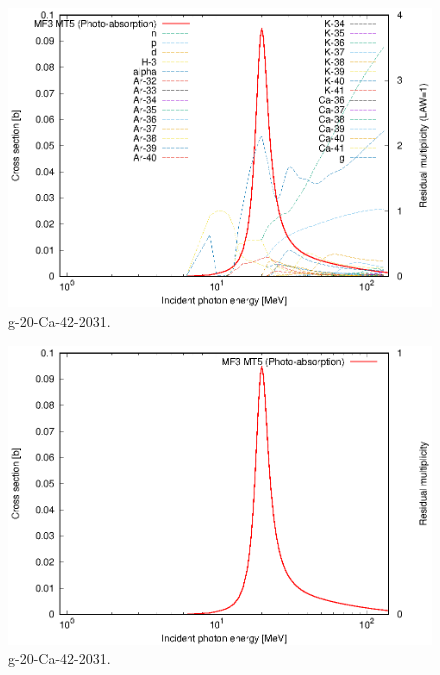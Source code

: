\begin{figure}
 \includegraphics[width=\linewidth]{eps/g_20-Ca-42_2031.eps}
  \caption{g-20-Ca-42-2031.}
\end{figure}
\begin{figure}
 \includegraphics[width=\linewidth]{eps-law0/g_20-Ca-42_2031.eps}
 \caption{g-20-Ca-42-2031.}
\end{figure}
\newpage \clearpage

